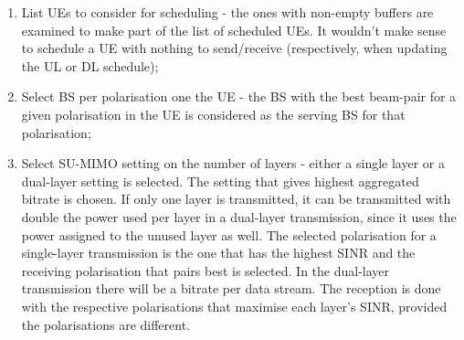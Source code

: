 \begin{enumerate}
    \item List UEs to consider for scheduling - the ones with non-empty buffers are examined to make part of the list of scheduled UEs. It wouldn't make sense to schedule a UE with nothing to send/receive (respectively, when updating the UL or DL schedule);
    \item Select BS per polarisation one the UE - the BS with the best beam-pair for a given polarisation in the UE is considered as the serving BS for that polarisation;
    \item Select SU-MIMO setting on the number of layers - either a single layer or a dual-layer setting is selected. The setting that gives highest aggregated bitrate is chosen. If only one layer is transmitted, it can be transmitted with double the power used per layer in a dual-layer transmission, since it uses the power assigned to the unused layer as well. The selected polarisation for a single-layer transmission is the one that has the highest SINR and the receiving polarisation that pairs best is selected. In the dual-layer transmission there will be a bitrate per data stream. The reception is done with the respective polarisations that maximise each layer's SINR, provided the polarisations are different.
    

\end{enumerate}
